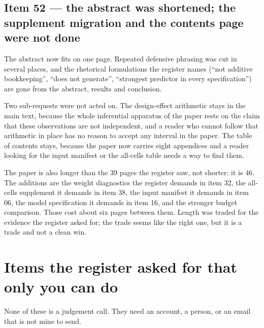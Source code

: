 \documentclass[11pt]{article}
\begin{document}
\subsection*{Item 52 --- the abstract was shortened; the supplement migration and the contents page were not done}

The abstract now fits on one page. Repeated defensive phrasing was cut in several places,
and the rhetorical formulations the register names (``not additive bookkeeping'', ``does not
generate'', ``strongest predictor in every specification'') are gone from the abstract,
results and conclusion.

Two sub-requests were not acted on. The design-effect arithmetic stays in the main text,
because the whole inferential apparatus of the paper rests on the claim that these
observations are not independent, and a reader who cannot follow that arithmetic in place
has no reason to accept any interval in the paper. The table of contents stays, because the
paper now carries eight appendices and a reader looking for the input manifest or the
all-cells table needs a way to find them.

The paper is also longer than the 39 pages the register saw, not shorter: it is 46. The
additions are the weight diagnostics the register demands in item 32, the all-cells
supplement it demands in item 38, the input manifest it demands in item 06, the model
specification it demands in item 16, and the stronger budget comparison. Those cost about
six pages between them. Length was traded for the evidence the register asked for; the
trade seems like the right one, but it is a trade and not a clean win.

\section{Items the register asked for that only you can do}\label{sec:yours}

None of these is a judgement call. They need an account, a person, or an email that is not
mine to send.
\end{document}
